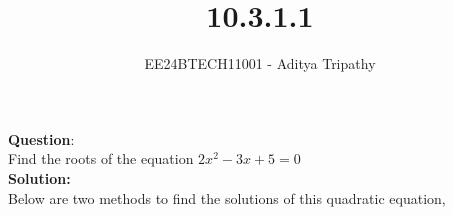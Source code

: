 \documentclass[journal]{IEEEtran}
\begin{document}

\vspace{3cm}

\title{10.3.1.1}
\author{EE24BTECH11001 - Aditya Tripathy}
 \maketitle
{\let\newpage\relax\maketitle}

\renewcommand{\thefigure}{\theenumi}
\renewcommand{\thetable}{\theenumi}
\setlength{\intextsep}{10pt} %


\renewcommand{\thetable}{\theenumi}


\textbf{Question}:\\
Find the roots of the equation $2x^2 - 3x + 5 = 0$
\\
\textbf{Solution: }\\
Below are two methods to find the solutions of this quadratic equation,
\end{document}
